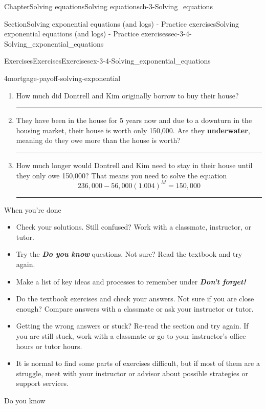 \documentclass[twoside,11pt,]{book}
\newcommand{\alert}[1]{\textbf{\textit{#1}}}
\newcommand{\terminology}[1]{\textbf{#1}}
\newlength{\workspacestrutwidth}
\numberwithin{equation}{section}
\begin{document}
\begin{chapterptx}{Chapter}{Solving equations}{}{Solving equations}{}{}{ch-3-Solving_equations}
\begin{sectionptx}{Section}{Solving exponential equations (and logs) - Practice exercises}{}{Solving exponential equations (and logs) - Practice exercises}{}{}{sec-3-4-Solving_exponential_equations}
\begin{exercises-subsection-numberless}{Exercises}{Exercises}{}{Exercises}{}{}{ex-3-4-Solving_exponential_equations}
\begin{divisionexercise}{4}{}{}{mortgage-payoff-solving-exponential}
\begin{enumerate}[label=(\alph*),ref=\alph*]%
\item{}How much did Dontrell and Kim originally borrow to buy their house?%
\par\rule{\workspacestrutwidth}{1.5in}%
\item{}They have been in the house for 5 years now and due to a downturn in the housing market, their house is worth only \textdollar{}150,000. Are they \terminology{underwater}, meaning do they owe more than the house is worth?%
\par\rule{\workspacestrutwidth}{1.5in}%
\item{}How much longer would Dontrell and Kim need to stay in their house until they only owe \textdollar{}150,000? That means you need to solve the equation%
\begin{equation*}
236{,}000-56{,}000(1.004)^M=150{,}000
\end{equation*}
%
\par\rule{\workspacestrutwidth}{1.75in}%
\end{enumerate}%
\end{divisionexercise}%
\end{exercises-subsection-numberless}
\begin{conclusion}{When you're done \textellipsis{}}%
%
\begin{itemize}[label=\textbullet]
\item{}Check your solutions. Still confused? Work with a classmate, instructor, or tutor.%
\item{}Try the \alert{Do you know} questions. Not sure? Read the textbook and try again.%
\item{}Make a list of key ideas and processes to remember under \alert{Don't forget!}%
\item{}Do the textbook exercises and check your answers. Not sure if you are close enough? Compare answers with a classmate or ask your instructor or tutor.%
\item{}Getting the wrong answers or stuck? Re-read the section and try again. If you are still stuck, work with a classmate or go to your instructor's office hours or tutor hours.%
\item{}It is normal to find some parts of exercises difficult, but if most of them are a struggle, meet with your instructor or advisor about possible strategies or support services.%
\end{itemize}
%
\end{conclusion}%
\begin{conclusion}{Do you know \textellipsis{}}%

\end{conclusion}
\end{sectionptx}
\end{chapterptx}
\end{document}
